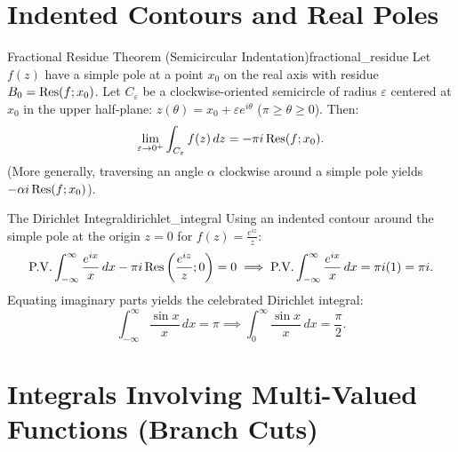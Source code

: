 \section{Indented Contours and Real Poles}

\begin{theorem}{Fractional Residue Theorem (Semicircular Indentation)}{fractional_residue}
Let $f(z)$ have a simple pole at a point $x_0$ on the real axis with residue $B_0 = \operatorname{Res}(f; x_0)$.
Let $C_\varepsilon$ be a clockwise-oriented semicircle of radius $\varepsilon$ centered at $x_0$ in the upper half-plane: $z(\theta) = x_0 + \varepsilon e^{i\theta}$ ($\pi \ge \theta \ge 0$). Then:
\begin{equation}
\lim_{\varepsilon \to 0^+} \int_{C_\varepsilon} f(z)\, dz = -\pi i \operatorname{Res}(f; x_0).
\end{equation}
(More generally, traversing an angle $\alpha$ clockwise around a simple pole yields $-\alpha i \operatorname{Res}(f; x_0)$).
\end{theorem}

\begin{example}{The Dirichlet Integral}{dirichlet_integral}
Using an indented contour around the simple pole at the origin $z = 0$ for $f(z) = \frac{e^{iz}}{z}$:
\begin{equation}
\text{P.V.} \int_{-\infty}^\infty \frac{e^{ix}}{x}\, dx - \pi i \operatorname{Res}\left(\frac{e^{iz}}{z}; 0\right) = 0 \implies \text{P.V.} \int_{-\infty}^\infty \frac{e^{ix}}{x}\, dx = \pi i (1) = \pi i.
\end{equation}
Equating imaginary parts yields the celebrated Dirichlet integral:
\begin{equation}
\int_{-\infty}^\infty \frac{\sin x}{x}\, dx = \pi \implies \int_0^\infty \frac{\sin x}{x}\, dx = \frac{\pi}{2}.
\end{equation}
\end{example}


\section{Integrals Involving Multi-Valued Functions (Branch Cuts)}

